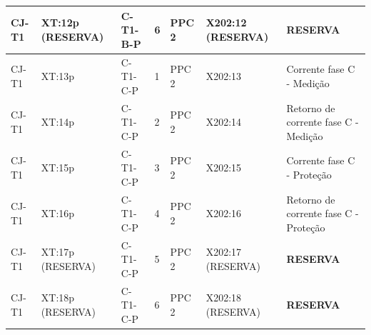 \documentclass[11pt,a4paper]{article}
\newcommand{\res}{\textbf{RESERVA}}
\begin{document}
\begin{landscape}
\begin{longtable}{@{}L{2.5cm}L{2.4cm}L{2.8cm}L{0.85cm}L{2.4cm}L{2.6cm}L{9.5cm}@{}}
CJ-T1 & XT:12p (RESERVA) & C-T1-B-P & 6 & PPC 2 & X202:12 (RESERVA) & \res{}\\
\midrule
CJ-T1 & XT:13p & C-T1-C-P & 1 & PPC 2 & X202:13 & Corrente fase C - Medição\\
CJ-T1 & XT:14p & C-T1-C-P & 2 & PPC 2 & X202:14 & Retorno de corrente fase C - Medição\\
CJ-T1 & XT:15p & C-T1-C-P & 3 & PPC 2 & X202:15 & Corrente fase C - Proteção\\
CJ-T1 & XT:16p & C-T1-C-P & 4 & PPC 2 & X202:16 & Retorno de corrente fase C - Proteção\\
CJ-T1 & XT:17p (RESERVA) & C-T1-C-P & 5 & PPC 2 & X202:17 (RESERVA) & \res{}\\
CJ-T1 & XT:18p (RESERVA) & C-T1-C-P & 6 & PPC 2 & X202:18 (RESERVA) & \res{}\\
\end{longtable}\endgroup\end{landscape}
\end{document}
